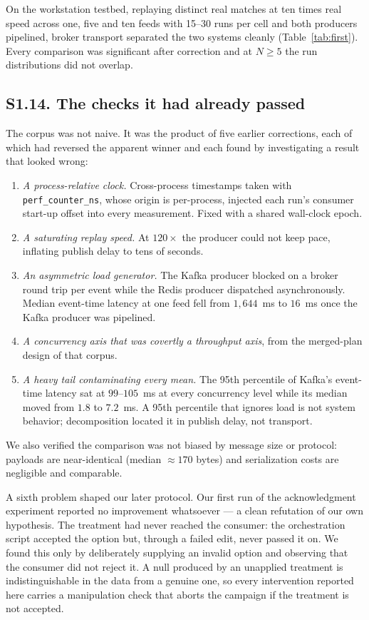 \documentclass[10pt,journal,onecolumn]{IEEEtran}
\newcommand{\kafka}{Kafka}
\newcommand{\redis}{Redis}
\begin{document}
On the workstation testbed, replaying distinct real matches at ten times real speed across one, five and ten
feeds with 15--30 runs per cell and both producers pipelined, broker transport separated the two systems cleanly (Table~\ref{tab:first}). Every comparison was significant after correction and at
$N \geq 5$ the run distributions did not overlap.


\subsection{S1.14. The checks it had already passed}

The corpus was not naive. It was the product of five earlier corrections, each of which had
reversed the apparent winner and each found by investigating a result that looked wrong:

\begin{enumerate}
\item \emph{A process-relative clock.} Cross-process timestamps taken with
\texttt{perf\_counter\_ns}, whose origin is per-process, injected each run's consumer start-up
offset into every measurement. Fixed with a shared wall-clock epoch.
\item \emph{A saturating replay speed.} At $120\times$ the producer could not keep pace,
inflating publish delay to tens of seconds.
\item \emph{An asymmetric load generator.} The \kafka{} producer blocked on a broker round trip
per event while the \redis{} producer dispatched asynchronously. Median event-time latency at one feed fell
from $1{,}644$~ms to $16$~ms once the \kafka{} producer was pipelined.
\item \emph{A concurrency axis that was covertly a throughput axis}, from the merged-plan design of that corpus.
\item \emph{A heavy tail contaminating every mean.} The 95th percentile of \kafka{}'s event-time latency sat at
$99$--$105$~ms at every concurrency level while its median moved from $1.8$ to $7.2$~ms. A 95th
percentile that ignores load is not system behavior; decomposition located it in publish delay,
not transport.
\end{enumerate}

We also verified the comparison was not biased by message size or protocol: payloads are
near-identical (median ${\approx}170$ bytes) and serialization costs are negligible and
comparable.

A sixth problem shaped our later protocol. Our first run of the acknowledgment experiment reported no improvement whatsoever --- a clean refutation of our own
hypothesis. The treatment had never reached the consumer: the orchestration script accepted the
option but, through a failed edit, never passed it on. We found this only by deliberately
supplying an invalid option and observing that the consumer did not reject it. A null produced by
an unapplied treatment is indistinguishable in the data from a genuine one, so every intervention
reported here carries a manipulation check that aborts the campaign if the treatment is not
accepted.
\end{document}
